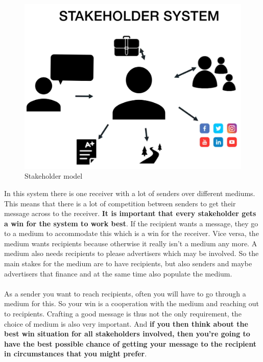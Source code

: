 \documentclass[../summary.tex]{subfiles}
\begin{document}
			\begin{figure}[h]
				\centering
				\includegraphics[width=0.7\linewidth]{../images/12-stakeholder-model.png}
				\caption{Stakeholder model}
				\label{fig:12-stakeholder-model}
			\end{figure}
			\newpage
			In this system there is one receiver with a lot of senders over different mediums. This means that there is a lot of competition between senders to get their message across to the receiver. \textbf{It is important that every stakeholder gets a win for the system to work best}. If the recipient wants a message, they go to a medium to accommodate this which is a win for the receiver. Vice versa, the medium wants recipients because otherwise it really isn't a medium any more. A medium also needs recipients to please advertisers which may be involved.  So the main stakes for the medium are to have recipients, but also senders and maybe advertisers that finance and at the same time also populate the medium.\\
			\\
			As a sender you want to reach recipients, often you will have to go through a medium for this. So your win is a cooperation with the medium and reaching out to recipients. Crafting a good message is thus not the only requirement, the choice of medium is also very important. And \textbf{if you then think about the best win situation for all stakeholders involved, then you're going to have the best possible chance of getting your message to the recipient in circumstances that you might prefer}.
			
\end{document}

